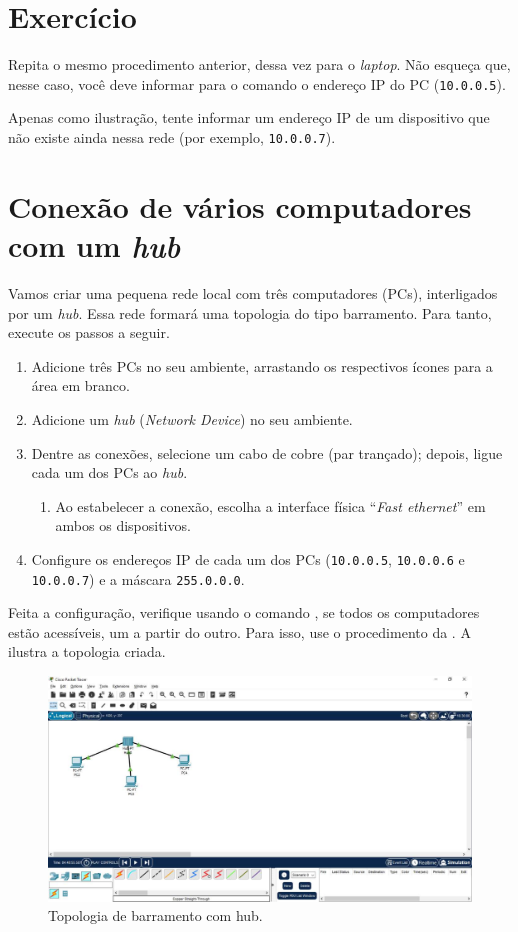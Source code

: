 \section{Exercício}
Repita o mesmo procedimento anterior, dessa vez para o \textit{laptop}. Não esqueça que, nesse caso, você deve informar para o comando  o endereço IP do PC (\texttt{10.0.0.5}).

Apenas como ilustração, tente informar um endereço IP de um dispositivo que não existe ainda nessa rede (por exemplo, \texttt{10.0.0.7}).

\section{Conexão de vários computadores com um \textit{hub}}\label{sec:conexHub}
Vamos criar uma pequena rede local com três computadores (PCs), interligados por um \textit{hub}. Essa rede formará uma topologia do tipo barramento. Para tanto, execute os passos a seguir.

\begin{enumerate}[label*=\arabic*.]
    \item Adicione três PCs no seu ambiente, arrastando os respectivos ícones para a área em branco.
    \item Adicione  um \textit{hub} (\textit{Network Device}) no seu ambiente.
    \item Dentre as conexões, selecione um cabo de cobre (par trançado); depois, ligue cada um dos PCs ao \textit{hub}. 
    \begin{enumerate}[label*=\arabic*.]
       \item Ao estabelecer a conexão, escolha a interface física \enquote{\textit{Fast ethernet}} em ambos os dispositivos.
    \end{enumerate}
    \item Configure os endereços IP de cada um dos PCs (\texttt{10.0.0.5}, \texttt{10.0.0.6} e \texttt{10.0.0.7}) e a máscara \texttt{255.0.0.0}.
\end{enumerate}

Feita a configuração, verifique usando o comando , se todos os computadores estão acessíveis, um a partir do outro. Para isso, use o procedimento da . A  ilustra a topologia criada.

\begin{figure}
    \centering
    \includegraphics[width=.99\textwidth]{Figuras/hub}
    \caption{Topologia de barramento com hub.}
    \label{fig:hub}
\end{figure}

